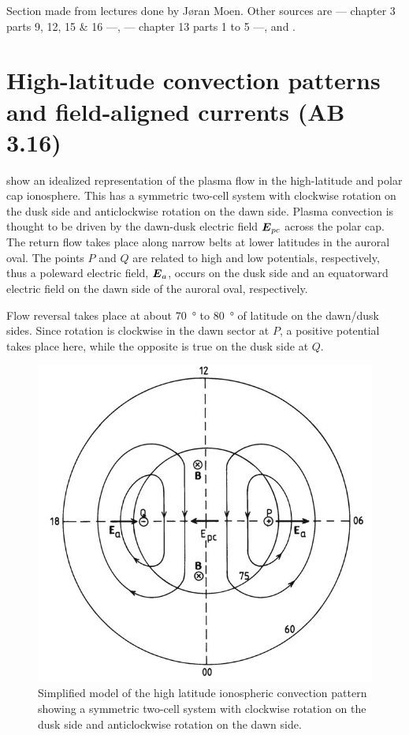 \begin{remark}
    Section made from lectures done by Jøran Moen. Other sources are \citet{BrekkeAsgeir2013Potu} --- chapter 3 parts 9, 12, 15 \& 16 ---, \citet{1995Itsp} --- chapter 13 parts 1 to 5 ---, \citet{NewellP.T.2004Mopb} and \citet{1992AnGeo..10..103C}.
\end{remark}
\section[High-latitude convection patterns \& field-aligned currents]{High-latitude convection patterns and field-aligned currents (AB 3.16)}
 show an idealized representation of the plasma flow in the high-latitude and polar cap ionosphere. This has a symmetric two-cell system with clockwise rotation on the dusk side and anticlockwise rotation on the dawn side. Plasma convection is thought to be driven by the dawn-dusk electric field \(\boldsymbol{E}_{pc}\) across the polar cap. The return flow takes place along narrow belts at lower latitudes in the auroral oval. The points \(P\) and \(Q\) are related to high and low potentials, respectively, thus a poleward electric field, \(\boldsymbol{E}_a\), occurs on the dusk side and an equatorward electric field on the dawn side of the auroral oval, respectively.

Flow reversal takes place at about \SI{70}{\degree} to \SI{80}{\degree} of latitude on the dawn/dusk sides. Since rotation is clockwise in the dawn sector at \(P\), a positive potential takes place here, while the opposite is true on the dusk side at \(Q\).
\begin{figure}[t]
    \centering
    \includegraphics[width=.6\linewidth]{bilder/L13_high_latitude_flow.jpg}
    \caption{Simplified model of the high latitude ionospheric convection pattern showing a symmetric two-cell system with clockwise rotation on the dusk side and anticlockwise rotation on the dawn side.}\label{fig:L13_high_latitude_flow}
\end{figure}

